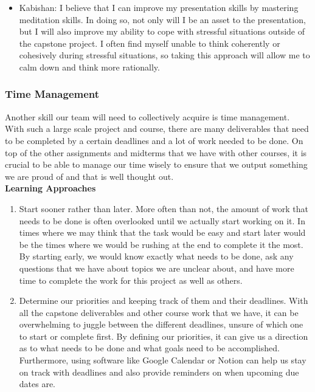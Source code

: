 \documentclass[12pt,letterpaper]{article}
\begin{document}
\begin{itemize}
    \item Kabishan: I believe that I can improve my presentation skills by mastering meditation skills. In doing so, not only will I be an asset to the presentation, but I will also improve my ability to cope with stressful situations outside of the capstone project. I often find myself unable to think coherently or cohesively during stressful situations, so taking this approach will allow me to calm down and think more rationally.
\end{itemize}

\subsubsection{Time Management}
Another skill our team will need to collectively acquire is time management. With such a large scale project and course, there are many deliverables that need to be completed by a certain deadlines and a lot of work needed to be done. On top of the other assignments and midterms that we have with other courses, it is crucial to be able to manage our time wisely to ensure that we output something we are proud of and that is well thought out.
\\[.1in]
\noindent \textbf{Learning Approaches}
\begin{enumerate}
    \item Start sooner rather than later. More often than not, the amount of work that needs to be done is often overlooked until we actually start working on it. In times where we may think that the task would be easy and start later would be the times where we would be rushing at the end to complete it the most. By starting early, we would know exactly what needs to be done, ask any questions that we have about topics we are unclear about, and have more time to complete the work for this project as well as others. 
    \item Determine our priorities and keeping track of them and their deadlines. With all the capstone deliverables and other course work that we have, it can be overwhelming to juggle between the different deadlines, unsure of which one to start or complete first. By defining our priorities, it can give us a direction as to what needs to be done and what goals need to be accomplished. Furthermore, using software like Google Calendar or Notion can help us stay on track with deadlines and also provide reminders on when upcoming due dates are.
\end{enumerate}
\end{document}
